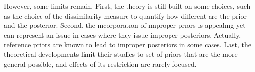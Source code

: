 

However, some limits remain. 
First, the theory is still built on some choices, such as the choice of the dissimilarity measure to quantify how different are the prior and the posterior.
Second, the incorporation of improper priors is appealing yet can represent an issue in cases where they issue improper posteriors. Actually, reference priors are known to lead to improper posteriors in some cases.
Last, the theoretical developments limit their studies to set of priors that are the more general possible, and effects of its restriction are rarely focused.












